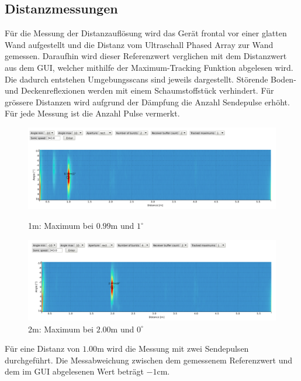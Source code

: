 \subsection{Distanzmessungen}\label{sec:distanzmessungen}
Für die Messung der Distanzauflösung wird das Gerät frontal vor einer glatten Wand aufgestellt und die Distanz vom Ultraschall Phased Array zur Wand gemessen. Daraufhin wird dieser Referenzwert verglichen mit dem Distanzwert aus dem GUI, welcher mithilfe der Maximum-Tracking Funktion abgelesen wird. Die dadurch entstehen Umgebungsscans sind jeweils dargestellt. Störende Boden- und Deckenreflexionen werden mit einem Schaumstoffstück verhindert. Für grössere Distanzen wird aufgrund der Dämpfung die Anzahl Sendepulse erhöht. Für jede Messung ist die Anzahl Pulse vermerkt.

\begin{figure}[htb]
\begin{minipage}{1.0\textwidth}
\includegraphics[width=\textwidth]{graphics/image_test_distance_01m.png}
\caption{1m: Maximum bei $0.99 \mathrm{m}$ und $1^{\circ}$} %
\label{fig:image_test_distance_01m}
%
\end{minipage}
\begin{minipage}{1.0\textwidth}
\includegraphics[width=\textwidth]{graphics/image_test_distance_02m.png}
\caption{2m: Maximum bei $2.00 \mathrm{m}$ und $0^{\circ}$} %
\label{fig:image_test_distance_02m}
%
\end{minipage}
\end{figure}
Für eine Distanz von $1.00 \mathrm{m}$ wird die Messung mit zwei Sendepulsen durchgeführt. Die Messabweichung zwischen dem gemessenem Referenzwert und dem im GUI abgelesenen Wert beträgt $-1 \mathrm{cm}$.

